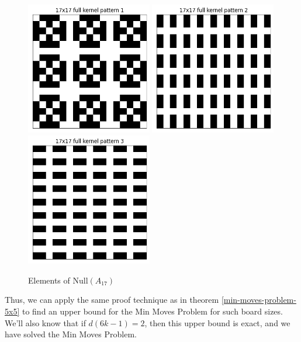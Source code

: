 \documentclass[a4paper]{article}
\begin{document}
	\begin{figure}[H]
		\centering
		\includegraphics[width=0.49\textwidth]{../../code/serialization/kernels/17x17/full/17x17_kernel_full_1.png}
		\includegraphics[width=0.49\textwidth]{../../code/serialization/kernels/17x17/full/17x17_kernel_full_2.png}
		\includegraphics[width=0.49\textwidth]{../../code/serialization/kernels/17x17/full/17x17_kernel_full_3.png}
		\caption{Elements of $\text{Null}(A_{17})$}
	\end{figure}
	
	Thus, we can apply the same proof technique as in theorem \ref{min-moves-problem-5x5} to find an upper bound for the Min Moves Problem for such board sizes.
	We'll also know that if $d(6k - 1) = 2$, then this upper bound is exact, and we have solved the Min Moves Problem.
	
\end{document}
